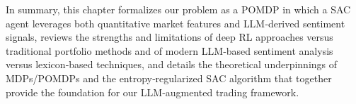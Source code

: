 In summary, this chapter formalizes our problem as a \gls{POMDP} in which a \gls{SAC} agent leverages both quantitative market features and \gls{LLM}‑derived sentiment signals, reviews the strengths and limitations of deep \gls{RL} approaches versus traditional portfolio methods and of modern \gls{LLM}‑based sentiment analysis versus lexicon‑based techniques, and details the theoretical underpinnings of \gls{MDP}s/\gls{POMDP}s and the entropy‑regularized \gls{SAC} algorithm that together provide the foundation for our \gls{LLM}‑augmented trading framework.
